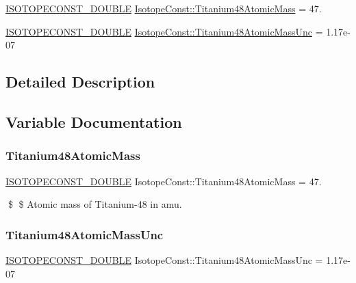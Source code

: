 \begin{DoxyCompactItemize}
\item 
\mbox{\hyperlink{group___isotope_const-_macros_ga8f45a7272ce02c0b4c65c44636ed719a}{I\+S\+O\+T\+O\+P\+E\+C\+O\+N\+S\+T\+\_\+\+D\+O\+U\+B\+LE}} \mbox{\hyperlink{group___isotope_const-_titanium-_ti48_ga236a08ff54982fea436dca1bfd45eb53}{Isotope\+Const\+::\+Titanium48\+Atomic\+Mass}} = 47.
\item 
\mbox{\hyperlink{group___isotope_const-_macros_ga8f45a7272ce02c0b4c65c44636ed719a}{I\+S\+O\+T\+O\+P\+E\+C\+O\+N\+S\+T\+\_\+\+D\+O\+U\+B\+LE}} \mbox{\hyperlink{group___isotope_const-_titanium-_ti48_ga152d4e328e22e66f5ac2a86e4549b1d2}{Isotope\+Const\+::\+Titanium48\+Atomic\+Mass\+Unc}} = 1.\+17e-\/07
\end{DoxyCompactItemize}


\subsection{Detailed Description}


\subsection{Variable Documentation}
\mbox{\label{group___isotope_const-_titanium-_ti48_ga236a08ff54982fea436dca1bfd45eb53}} 
\subsubsection{\texorpdfstring{Titanium48\+Atomic\+Mass}{Titanium48AtomicMass}}
{\footnotesize\ttfamily \mbox{\hyperlink{group___isotope_const-_macros_ga8f45a7272ce02c0b4c65c44636ed719a}{I\+S\+O\+T\+O\+P\+E\+C\+O\+N\+S\+T\+\_\+\+D\+O\+U\+B\+LE}} Isotope\+Const\+::\+Titanium48\+Atomic\+Mass = 47.}

\$ \$ Atomic mass of Titanium-\/48 in amu. \mbox{\label{group___isotope_const-_titanium-_ti48_ga152d4e328e22e66f5ac2a86e4549b1d2}} 
\subsubsection{\texorpdfstring{Titanium48\+Atomic\+Mass\+Unc}{Titanium48AtomicMassUnc}}
{\footnotesize\ttfamily \mbox{\hyperlink{group___isotope_const-_macros_ga8f45a7272ce02c0b4c65c44636ed719a}{I\+S\+O\+T\+O\+P\+E\+C\+O\+N\+S\+T\+\_\+\+D\+O\+U\+B\+LE}} Isotope\+Const\+::\+Titanium48\+Atomic\+Mass\+Unc = 1.\+17e-\/07}


